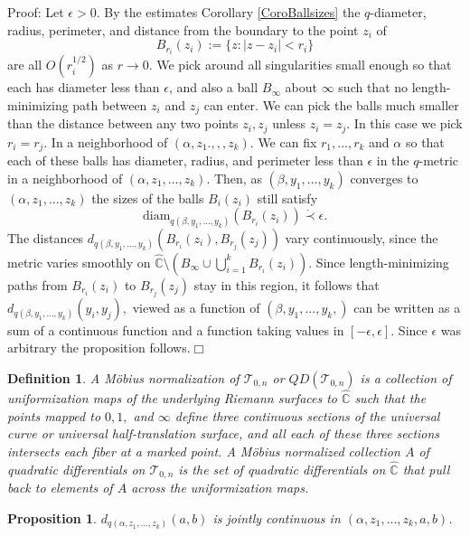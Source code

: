 \documentclass[12pt]{article}
\newtheorem{proposition}[theorem]{Proposition}
\newtheorem{definition}[theorem]{Definition}
\newcommand{\cc}{\mathbb{C}}
\newcommand{\diam}{\mathrm{diam}}
\begin{document}
\noindent Proof: Let $\epsilon > 0$. By the estimates Corollary \ref{CoroBallsizes} the $q$-diameter, radius, perimeter, and distance from the boundary to the point $z_i$ of $$B_{r_i}(z_i) := \{z: |z-z_i| <  r_i\}$$ are all $O(r_i^{1/2})$ as $r \to 0$. We pick  around all singularities small enough so that each has diameter less than $\epsilon$, and also a ball $B_\infty$ about $\infty$ such that no length-minimizing path between $z_i$ and $z_j$ can enter. We can pick the balls much smaller than the distance between any two points $z_i,z_j$ unless $z_i = z_j$. In this case we pick $r_i = r_j$. In a neighborhood of $(\alpha,z_1.,,,z_k)$. We can fix $r_1,...,r_k$ and $\alpha$ so that each of these balls has diameter, radius, and perimeter less than $\epsilon$ in the $q$-metric in a neighborhood of $(\alpha,z_1,...,z_k)$. Then, as $(\beta,y_1,...,y_k)$ converges to $(\alpha,z_1,...,z_k)$ the sizes of the balls $B_i(z_i)$ still satisfy $$\diam_{q(\beta,y_1,...,y_k)}(B_{r_i}(z_i)) \dot{\prec} \epsilon.$$ The distances $d_{q(\beta,y_1,...,y_k)}(B_{r_i}(z_i),B_{r_j}(z_j))$ vary continuously, since the metric varies smoothly on $\hat{\cc} \setminus (B_\infty \cup \bigcup\limits_{i = 1}^k B_{r_i}(z_i)).$ Since length-minimizing paths from $B_{r_i}(z_i)$ to $B_{r_j}(z_j)$ stay in this region, it follows that $d_{q(\beta,y_1,...,y_k)}(y_i,y_j),$ viewed as a function of $(\beta,y_1,...,y_k,)$ can be written as a sum of a continuous function and a function taking values in $[-\epsilon,\epsilon].$ Since $\epsilon$ was arbitrary the proposition follows.$\Box$

\begin{definition} A \emph{M\"obius normalization} of $\mathcal{T}_{0,n}$ or $QD(\mathcal{T}_{0,n})$ is a collection of uniformization maps of the underlying Riemann surfaces to $\hat{\cc}$ such that the points mapped to $0,1,$ and $\infty$ define three continuous sections of the universal curve or universal half-translation surface, and all each of these three sections intersects each fiber at a marked point. A \emph{M\"obius normalized} collection $A$ of quadratic differentials on $\mathcal{T}_{0,n}$ is the set of quadratic differentials on $\hat{\cc}$ that pull back to elements of $A$ across the uniformization maps.\end{definition}

\begin{proposition}\label{PropJointContDist} $d_{q(\alpha,z_1,...,z_k)}(a,b)$ is jointly continuous in $(\alpha,z_1,...,z_k,a,b)$. \end{proposition}
\end{document}
